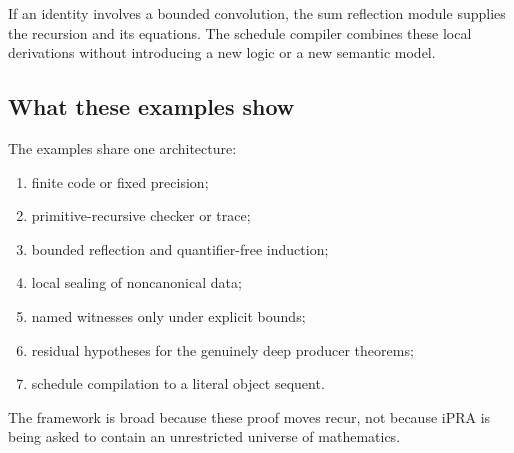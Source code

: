 If an identity involves a bounded convolution, the sum reflection module supplies the recursion and
its equations.  The schedule compiler combines these local derivations without introducing a new
logic or a new semantic model.

\subsection{What these examples show}

The examples share one architecture:

\begin{enumerate}
\item finite code or fixed precision;
\item primitive-recursive checker or trace;
\item bounded reflection and quantifier-free induction;
\item local sealing of noncanonical data;
\item named witnesses only under explicit bounds;
\item residual hypotheses for the genuinely deep producer theorems;
\item schedule compilation to a literal object sequent.
\end{enumerate}

The framework is broad because these proof moves recur, not because iPRA is being asked to contain an
unrestricted universe of mathematics.
